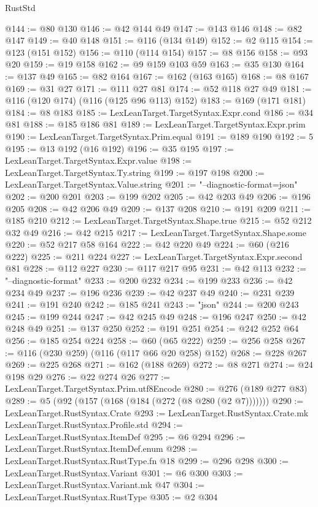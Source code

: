 \begin{lexlean}{RustStd}
\begin{coremodule}
@144 := @80 @130
@146 := @42 @144 @49
@147 := @143 @146
@148 := @82 @147
@149 := @40 @148
@151 := @116 (@134 @149)
@152 := @2 @115
@154 := @123 (@151 @152)
@156 := @110 (@114 @154)
@157 := @8 @156
@158 := @93 @20
@159 := @19 @158
@162 := @9 @159 @103 @59
@163 := @35 @130
@164 := @137 @49
@165 := @82 @164
@167 := @162 (@163 @165)
@168 := @8 @167
@169 := @31 @27
@171 := @111 @27 @81
@174 := @52 @118 @27 @49
@181 := @116 (@120 @174) (@116 (@125 @96 @113) @152)
@183 := @169 (@171 @181)
@184 := @8 @183
@185 := LexLeanTarget.TargetSyntax.Expr.cond
@186 := @34 @81
@188 := @185 @186 @81
@189 := LexLeanTarget.TargetSyntax.Expr.prim
@190 := LexLeanTarget.TargetSyntax.Prim.equal
@191 := @189 @190
@192 := 5
@195 := @13 @192 (@16 @192)
@196 := @35 @195
@197 := LexLeanTarget.TargetSyntax.Expr.value
@198 := LexLeanTarget.TargetSyntax.Ty.string
@199 := @197 @198
@200 := LexLeanTarget.TargetSyntax.Value.string
@201 := "--diagnostic-format=json"
@202 := @200 @201
@203 := @199 @202
@205 := @42 @203 @49
@206 := @196 @205
@208 := @42 @206 @49
@209 := @137 @208
@210 := @191 @209
@211 := @185 @210
@212 := LexLeanTarget.TargetSyntax.Shape.true
@215 := @52 @212 @32 @49
@216 := @42 @215
@217 := LexLeanTarget.TargetSyntax.Shape.some
@220 := @52 @217 @58 @164
@222 := @42 @220 @49
@224 := @60 (@216 @222)
@225 := @211 @224
@227 := LexLeanTarget.TargetSyntax.Expr.second @81
@228 := @112 @227
@230 := @117 @217 @95
@231 := @42 @113
@232 := "--diagnostic-format"
@233 := @200 @232
@234 := @199 @233
@236 := @42 @234 @49
@237 := @196 @236
@239 := @42 @237 @49
@240 := @231 @239
@241 := @191 @240
@242 := @185 @241
@243 := "json"
@244 := @200 @243
@245 := @199 @244
@247 := @42 @245 @49
@248 := @196 @247
@250 := @42 @248 @49
@251 := @137 @250
@252 := @191 @251
@254 := @242 @252 @64
@256 := @185 @254 @224
@258 := @60 (@65 @222)
@259 := @256 @258
@267 := @116 (@230 @259) (@116 (@117 @66 @20 @258) @152)
@268 := @228 @267
@269 := @225 @268
@271 := @162 (@188 @269)
@272 := @8 @271
@274 := @24 @198 @29
@276 := @22 @274 @26
@277 := LexLeanTarget.TargetSyntax.Prim.utf8Encode
@280 := @276 (@189 @277 @83)
@289 := @5 (@92 (@157 (@168 (@184 (@272 (@8 @280 (@2 @7)))))))
@290 := LexLeanTarget.RustSyntax.Crate
@293 := LexLeanTarget.RustSyntax.Crate.mk LexLeanTarget.RustSyntax.Profile.std
@294 := LexLeanTarget.RustSyntax.ItemDef
@295 := @6 @294
@296 := LexLeanTarget.RustSyntax.ItemDef.enum
@298 := LexLeanTarget.RustSyntax.RustType.fn @18
@299 := @296 @298
@300 := LexLeanTarget.RustSyntax.Variant
@301 := @6 @300
@303 := LexLeanTarget.RustSyntax.Variant.mk @47
@304 := LexLeanTarget.RustSyntax.RustType
@305 := @2 @304

\end{coremodule}
\end{lexlean}

